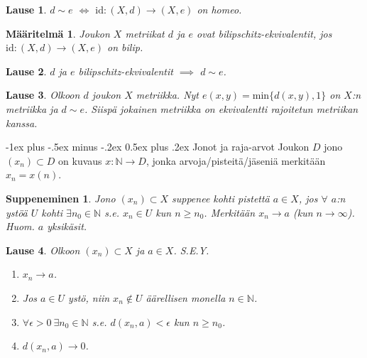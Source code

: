 \documentclass[landscape,a4paper,10pt]{article}
\makeatletter
\renewcommand{\section}{\@startsection{section}{1}{0mm}%
                                {-1ex plus -.5ex minus -.2ex}%
                                {0.5ex plus .2ex}%
                                {\color{blue}\normalfont\large\bfseries}}
\theoremstyle{customtheoremstyle}
\newtheorem*{theorem}{Lause}
\newtheorem*{definition}{Määritelmä}
\makeatother
\begin{document}
\begin{multicols*}{3}
\begin{theorem}
  $d \sim e$ $\iff$ $\text{id}: (X,d) \rightarrow (X,e)$ on homeo.
\end{theorem}

\begin{definition}
  Joukon $X$ metriikat $d$ ja $e$ ovat \emph{bilipschitz-ekvivalentit}, jos
  $\text{id}: (X,d) \rightarrow (X,e)$ on bilip.
\end{definition}

\begin{theorem}
  $d$ ja $e$ bilipschitz-ekvivalentit $\implies$ $d \sim e$.
\end{theorem}

\begin{theorem}
  Olkoon $d$ joukon $X$ metriikka. Nyt $e(x,y) = \text{min}\{d(x,y), 1\}$ on
  $X$:n metriikka ja $d \sim e$. Siispä jokainen metriikka on ekvivalentti
  rajoitetun metriikan kanssa.
\end{theorem}

\section{Jonot ja raja-arvot}
Joukon $D$ jono $(x_n) \subset D$ on kuvaus $x: \mathbb{N} \rightarrow D$,
jonka arvoja/pisteitä/jäseniä merkitään $x_n = x(n)$.

\newtheorem*{defn:suppeneminen}{Suppeneminen}
\begin{defn:suppeneminen}
  Jono $(x_n) \subset X$ suppenee kohti pistettä $a \in X$, jos $\forall$ $a$:n
  ystöä $U$ kohti $\exists n_0 \in \mathbb{N}$ s.e. $x_n \in U$ kun $n \geq
  n_0$. Merkitään $x_n \rightarrow a$ (kun $n \rightarrow \infty$). Huom. $a$
  yksikäsit.
\end{defn:suppeneminen}

\begin{theorem}
  Olkoon $(x_n) \subset X$ ja $a \in X$. S.E.Y.
  \begin{enumerate}
    \item{$x_n \rightarrow a$.}
    \item{Jos $a \in U$ ystö, niin $x_n \not\in U$ äärellisen monella $n \in
      \mathbb{N}$.}
    \item{$\forall \epsilon > 0 \: \exists n_0 \in \mathbb{N}$ s.e. $d(x_n, a) <
      \epsilon$ kun $n \geq n_0$.}
    \item{$d(x_n, a) \rightarrow 0$.}
  \end{enumerate}
\end{theorem}


\end{multicols*}
\end{document}
